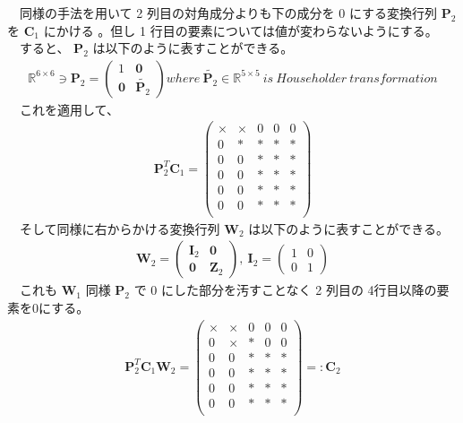 \documentclass[a4paper,10pt]{jarticle}
\begin{document}
　同様の手法を用いて 2 列目の対角成分よりも下の成分を 0 にする変換行列 \(\bm{P}_2\) を \(\bm{C}_1\) にかける 。但し 1 行目の要素については値が変わらないようにする。\\
　すると、 \(\bm{P}_2\) は以下のように表すことができる。\\
\begin{align*}
\mathbb{R}^{6\times 6} \ni \bm{P}_2 =
\begin{pmatrix}
1 & \bm{0}\\
\bm{0} & \tilde{\bm{P}_2}
\end{pmatrix}
where\ \tilde{\bm{P}_2} \in \mathbb{R}^{5\times5}\ is\ Householder\ transformation
\end{align*}
　これを適用して、\\
\begin{align*}
\bm{P}^T_2\bm{C}_1 = 
\begin{pmatrix}
\times & \times & 0 & 0 & 0\\ 
0 & \ast & \ast & \ast & \ast\\
0 & 0 & \ast & \ast & \ast\\
0 & 0 & \ast & \ast & \ast\\
0 & 0 & \ast & \ast & \ast\\
0 & 0 & \ast & \ast & \ast\\
\end{pmatrix}
\end{align*}
　そして同様に右からかける変換行列 \(\bm{W}_2\) は以下のように表すことができる。\\
\begin{align*}
\bm{W}_2 =
\begin{pmatrix}
\bm{I}_2 & \bm{0}\\
\bm{0} & \bm{Z}_2 
\end{pmatrix}
,\ 
\bm{I}_2 = 
\begin{pmatrix}
1 & 0 \\
0 & 1
\end{pmatrix}
\end{align*}
　これも \(\bm{W}_1\) 同様 \(\bm{P}_2\) で 0 にした部分を汚すことなく 2 列目の 4行目以降の要素を0にする。\\
\begin{align*}
\bm{P}^T_2\bm{C}_1\bm{W}_2 = 
\begin{pmatrix}
\times & \times & 0 & 0 & 0 \\  
0 & \times & \ast & 0 & 0 \\
0 & 0 & \ast & \ast & \ast \\
0 & 0 & \ast & \ast & \ast \\
0 & 0 & \ast & \ast & \ast \\
0 & 0 & \ast & \ast & \ast \\
\end{pmatrix}
=: \bm{C}_2
\end{align*}
\end{document}
